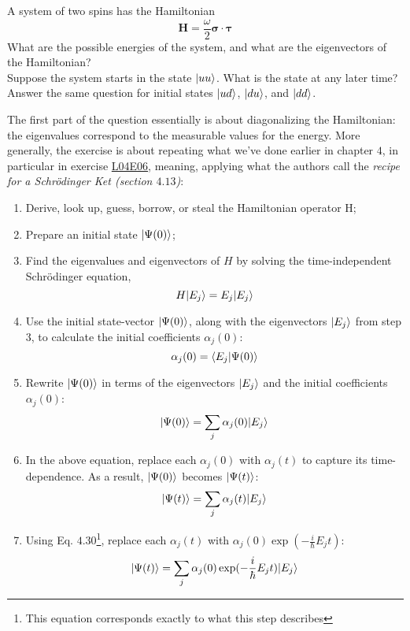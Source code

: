 \documentclass[solutions.tex]{subfiles}
\begin{document}
\maketitle
\begin{exercise} A system of two spins has the Hamiltonian
\[
	\bm{H} = \frac\omega2\bm{\sigma}\cdot\bm{\tau}
\]
What are the possible energies of the system, and what are the
eigenvectors of the Hamiltonian? \\

Suppose the system starts in the state $|uu\rangle$. What is the
state at any later time? Answer the same question for initial
states $|ud\rangle$, $|du\rangle$, and $|dd\rangle$.
\end{exercise}

The first part of the question essentially is about diagonalizing
the Hamiltonian: the eigenvalues correspond to the measurable values
for the energy. More generally, the exercise is about repeating what
we've done earlier in chapter $4$, in particular in exercise
\href{https://github.com/mbivert/ttm/blob/master/qm/L04E06.pdf}{L04E06},
meaning, applying what the authors call the \textit{recipe for a Schr\"odinger
Ket (section $4.13$)}:
\begin{enumerate}
	\item Derive, look up, guess, borrow, or steal the Hamiltonian
	operator H;
	\item Prepare an initial state $|\Psi(0)\rangle$;
	\item Find the eigenvalues and eigenvectors of $H$ by solving
	the time-independent Schr\"odinger equation,
	\[
		H|E_j\rangle = E_j|E_j\rangle
	\]
	\item Use the initial state-vector $|\Psi(0)\rangle$, along with
	the eigenvectors $|E_j\rangle$ from step 3, to calculate the initial
	coefficients $\alpha_j(0)$:
	\[
		\alpha_j(0) = \left\langle E_j \middle| \Psi(0) \right\rangle
	\]
	\item Rewrite $|\Psi(0)\rangle$ in terms of the eigenvectors
	$|E_j\rangle$ and the initial coefficients $\alpha_j(0)$:
	\[
		|\Psi(0)\rangle = \sum_j\alpha_j(0)|E_j\rangle
	\]
	\item In the above equation, replace each $\alpha_j(0)$ with
	$\alpha_j(t)$ to capture its time-dependence. As a result, $|\Psi(0)\rangle$
	becomes $|\Psi(t)\rangle$:
	\[
		|\Psi(t)\rangle = \sum_j\alpha_j(t)|E_j\rangle
	\]
	\item Using Eq. $4.30$\footnote{This equation corresponds
	exactly to what this step describes}, replace each $\alpha_j(t)$ with
	$\alpha_j(0)\exp(-\frac{i}\hbar E_jt)$:
	\[
		|\Psi(t)\rangle = \sum_j\alpha_j(0)\exp(-\frac{i}\hbar E_jt)|E_j\rangle
	\]
\end{enumerate}
\end{document}
